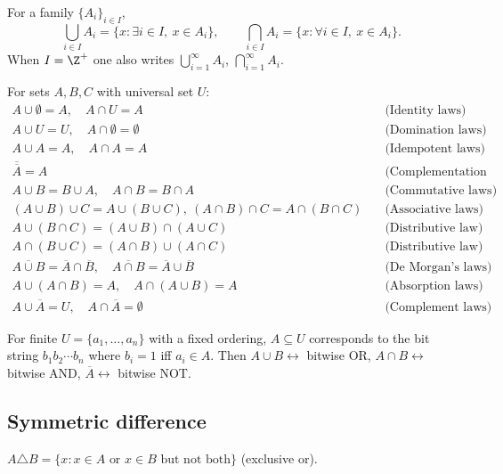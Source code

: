 \begin{definition}
For a family $\{A_i\}_{i\in I}$,
\[
\bigcup_{i \in I} A_i = \{x : \exists i \in I,\ x \in A_i\}, \qquad
\bigcap_{i \in I} A_i = \{x : \forall i \in I,\ x \in A_i\}.
\]
When $I = \Z^+$ one also writes $\displaystyle\bigcup_{i=1}^{\infty} A_i$, $\displaystyle\bigcap_{i=1}^{\infty} A_i$.
\end{definition}

\begin{theorem}
For sets $A,B,C$ with universal set $U$:
\begin{align*}
A \cup \emptyset = A,\quad A \cap U = A &\quad\text{(Identity laws)}\\
A \cup U = U,\quad A \cap \emptyset = \emptyset &\quad\text{(Domination laws)}\\
A \cup A = A,\quad A \cap A = A &\quad\text{(Idempotent laws)}\\
\overline{\overline{A}} = A &\quad\text{(Complementation law)}\\
A \cup B = B \cup A,\quad A \cap B = B \cap A &\quad\text{(Commutative laws)}\\
(A\cup B)\cup C = A\cup(B\cup C),\ (A\cap B)\cap C = A\cap(B\cap C) &\quad\text{(Associative laws)}\\
A\cup(B\cap C) = (A\cup B)\cap(A\cup C) &\quad\text{(Distributive law)}\\
A\cap(B\cup C) = (A\cap B)\cup(A\cap C) &\quad\text{(Distributive law)}\\
\overline{A\cup B} = \overline A\cap\overline B,\quad \overline{A\cap B}=\overline A\cup\overline B &\quad\text{(De Morgan's laws)}\\
A\cup(A\cap B) = A,\quad A\cap(A\cup B)=A &\quad\text{(Absorption laws)}\\
A \cup \overline A = U,\quad A \cap \overline A = \emptyset &\quad\text{(Complement laws)}
\end{align*}
\end{theorem}

\begin{definition}
For finite $U = \{a_1,\dots,a_n\}$ with a fixed ordering, $A \subseteq U$ corresponds to the bit string $b_1b_2\cdots b_n$ where $b_i = 1$ iff $a_i \in A$. Then $A\cup B \leftrightarrow$ bitwise OR, $A\cap B \leftrightarrow$ bitwise AND, $\overline{A} \leftrightarrow$ bitwise NOT.
\end{definition}

\subsection{Symmetric difference}
\label{sec:1-13}
\begin{definition}
$A \triangle B = \{x : x \in A \text{ or } x \in B \text{ but not both}\}$ (exclusive or).
\end{definition}

